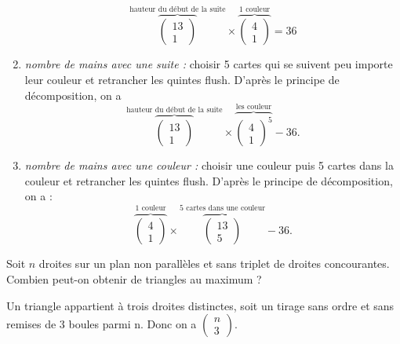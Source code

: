 \documentclass{book}
\begin{document}
\begin{Exercice}[Poker]
\begin{Correction}
\begin{enumerate}
$$
\overbrace{\begin{pmatrix}13\\1\end{pmatrix}}^
{\text{hauteur du début de la suite}}
\times
\overbrace{\begin{pmatrix}4\\1\end{pmatrix}}^
{\text{1 couleur}}
=36$$
\item  \textit{nombre de mains avec une suite :} choisir 5 cartes qui se suivent peu importe
leur couleur et retrancher les quintes flush. D'après le principe de décomposition,  on a  
$$\overbrace{\begin{pmatrix}13\\1\end{pmatrix}}^
{\text{hauteur du début de la suite}}
\times
\overbrace{\begin{pmatrix}4\\1\end{pmatrix}^5}^
{\text{les couleur}}-36.$$
\item   \textit{nombre de mains avec une couleur :} choisir une couleur puis 5 cartes dans
la couleur et retrancher les quintes flush. D'après le principe de décomposition,  on a  :
$$\overbrace{\begin{pmatrix}4\\1\end{pmatrix}}^
{\text{1 couleur}}
\times
\overbrace{\begin{pmatrix}13\\5\end{pmatrix}}^
{\text{5 cartes dans une couleur}}-36.$$
\end{enumerate}

\end{Correction}
\end{Exercice}

\begin{Exercice}[géométrie]
Soit $n$ droites sur un plan non parallèles  et sans  triplet de droites concourantes. Combien peut-on obtenir de triangles au maximum ?
\begin{Correction}
Un triangle appartient à trois droites distinctes, soit un tirage sans ordre et sans remises de 3 boules parmi n. Donc on a $\begin{pmatrix}
n\\3
\end{pmatrix}.$
\end{Correction}

\end{Exercice}
\end{document}
